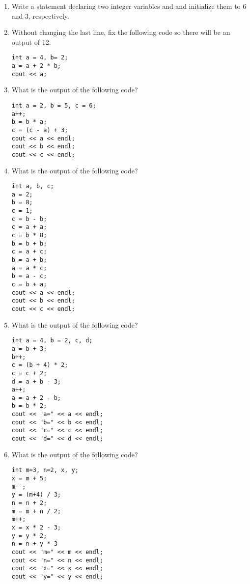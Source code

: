 \begin{enumerate}
\item Write a statement declaring two integer variables  and  and initialize them to 6 and 3, respectively. 
\item Without changing the last line, fix the following code so there will be an output of 12. \nopagebreak[4]

\noindent\begin{minipage}{\linewidth}\begin{lstlisting}
int a = 4, b= 2;
a = a + 2 * b;
cout << a;
\end{lstlisting}\end{minipage}

\item What is the output of the following code? \nopagebreak[4]

\noindent\begin{minipage}{\linewidth}\begin{lstlisting}
int a = 2, b = 5, c = 6;
a++;
b = b * a;
c = (c - a) + 3;
cout << a << endl;
cout << b << endl;
cout << c << endl;
\end{lstlisting}\end{minipage}	
	
\item What is the output of the following code? \nopagebreak[4]

\noindent\begin{minipage}{\linewidth}\begin{lstlisting}
int a, b, c;
a = 2;
b = 8;
c = 1;
c = b - b;
c = a + a;
c = b * 8;
b = b + b;
c = a + c;
b = a + b;
a = a * c;
b = a - c;
c = b + a;
cout << a << endl;
cout << b << endl;
cout << c << endl;
\end{lstlisting}\end{minipage}

\item What is the output of the following code? \nopagebreak[4]

\noindent\begin{minipage}{\linewidth}\begin{lstlisting}
int a = 4, b = 2, c, d;
a = b + 3;
b++;
c = (b + 4) * 2;
c = c + 2;
d = a + b - 3;
a++;
a = a + 2 - b;
b = b * 2;
cout << "a=" << a << endl;  
cout << "b=" << b << endl;  
cout << "c=" << c << endl;  
cout << "d=" << d << endl; 
\end{lstlisting}\end{minipage}

\item What is the output of the following code? \nopagebreak[4]

\noindent\begin{minipage}{\linewidth}\begin{lstlisting}
int m=3, n=2, x, y;
x = m + 5;
m--;
y = (m+4) / 3;
n = n + 2;
m = m + n / 2;
m++;
x = x * 2 - 3;
y = y * 2;
n = n + y * 3
cout << "m=" << m << endl; 
cout << "n=" << n << endl;  
cout << "x=" << x << endl;   
cout << "y=" << y << endl; 
\end{lstlisting}\end{minipage}
\end{enumerate}


